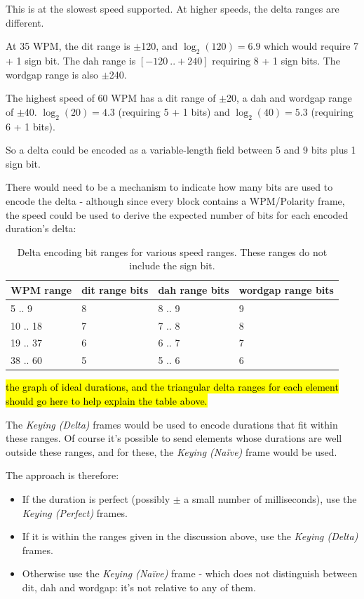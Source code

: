 \documentclass[a4paper]{tufte-handout}
\begin{document}
This is at the slowest speed supported. At higher speeds, the delta ranges are different. 

At 35 WPM, the dit range is $\pm$120, and $\log_2\left(120\right) = 6.9$ which would require 7 + 1 sign bit. The dah range is $[-120 ~.. +240]$ requiring 8 + 1 sign bits. The wordgap range is also $\pm$240.

The highest speed of 60 WPM has a dit range of $\pm$20, a dah and wordgap range of $\pm$40. $\log_2\left(20\right) = 4.3$ (requiring 5 + 1 bits) and $\log_2\left(40\right) = 5.3$ (requiring 6 + 1 bits).

So a delta could be encoded as a variable-length field between 5 and 9 bits plus 1 sign bit.

There would need to be a mechanism to indicate how many bits are used to encode the delta - although since every block contains a WPM/Polarity frame, the speed could be used to derive the expected number of bits for each encoded duration's delta: 
    \begin{table}[h]
        \selectfont
        \begin{tabular}{llll}
            \toprule
            WPM range & dit range bits & dah range bits & wordgap range bits \\
            \midrule
            5 .. 9    & 8              & 8 .. 9         & 9 \\
            10 .. 18  & 7              & 7 .. 8         & 8 \\
            19 .. 37  & 6              & 6 .. 7         & 7 \\
            38 .. 60  & 5              & 5 .. 6         & 6 \\
		\end{tabular}
		\caption{Delta encoding bit ranges for various speed ranges. These ranges do not include the sign bit.}
		\label{table:delta-encoding-bit-ranges}
	\end{table}

\hl{the graph of ideal durations, and the triangular delta ranges for each element should go here to help explain the table above.}

The \emph{Keying (Delta)} frames would be used to encode durations that fit within these ranges. 
Of course it's possible to send elements whose durations are well outside these ranges, and for these, the \emph{Keying (Naïve)} frame would be used.

The approach is therefore:
\begin{itemize}
    \setlength\itemsep{-0.5em}
    \item If the duration is perfect (possibly $\pm$ a small number of milliseconds), use the \emph{Keying (Perfect)} frames.
    \item If it is within the ranges given in the discussion above, use the \emph{Keying (Delta)} frames.
    \item Otherwise use the \emph{Keying (Naïve)} frame - which does not distinguish between dit, dah and wordgap: it's not relative to any of them.
\end{itemize}
\end{document}
